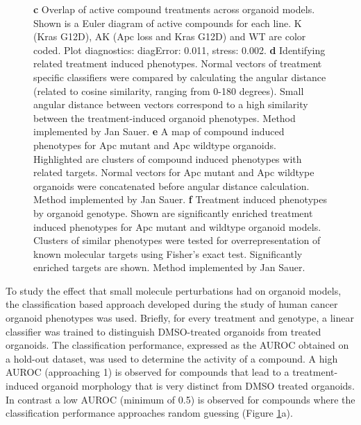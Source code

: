 \begin{flushleft}
\begin{figure}[H]
{\textbf{c} Overlap of active compound treatments across organoid models. Shown is a Euler diagram of active compounds for each line. K (Kras G12D), AK (Apc loss and Kras G12D) and WT are color coded. Plot diagnostics: diagError: 0.011, stress: 0.002.
\textbf{d} Identifying related treatment induced phenotypes. Normal vectors of treatment specific classifiers were compared by calculating the angular distance (related to cosine similarity, ranging from 0-180 degrees). Small angular distance between vectors correspond to a high similarity between the treatment-induced organoid phenotypes. Method implemented by Jan Sauer.
\textbf{e} A map of compound induced phenotypes for Apc mutant and Apc wildtype organoids. Highlighted are clusters of compound induced phenotypes with related targets. Normal vectors for Apc mutant and Apc wildtype organoids were concatenated before angular distance calculation. Method implemented by Jan Sauer.
\textbf{f} Treatment induced phenotypes by organoid genotype. Shown are significantly enriched treatment induced phenotypes for Apc mutant and wildtype organoid models. Clusters of similar phenotypes were tested for overrepresentation of known molecular targets using Fisher’s exact test. Significantly enriched targets are shown. Method implemented by Jan Sauer.
}
\label{fig_150}
\end{figure}
\bigbreak

To study the effect that small molecule perturbations had on organoid models, the classification based approach developed during the study of human cancer organoid phenotypes was used. Briefly, for every treatment and genotype, a linear classifier was trained to distinguish DMSO-treated organoids from treated organoids. The classification performance, expressed as the AUROC obtained on a hold-out dataset, was used to determine the activity of a compound. A high AUROC (approaching 1) is observed for compounds that lead to a treatment-induced organoid morphology that is very distinct from DMSO treated organoids. In contrast a low AUROC (minimum of 0.5) is observed for compounds where the classification performance approaches random guessing (Figure \ref{fig_150}a).


\end{flushleft}
